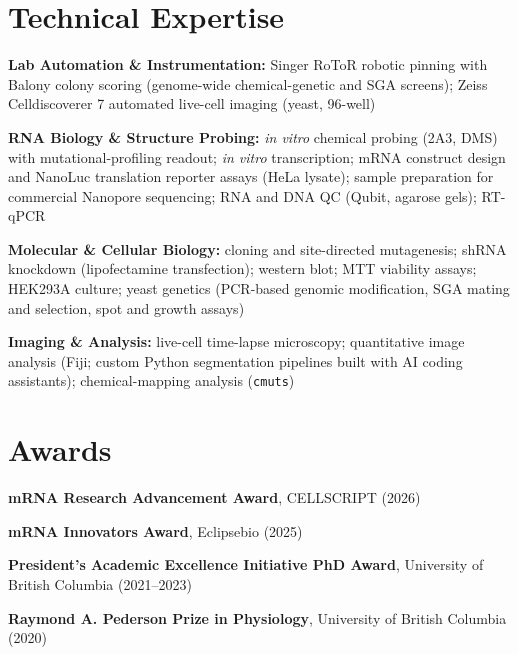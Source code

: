 \documentclass[letterpaper,11pt]{article}
\begin{document}
\section{Technical Expertise}
\begin{itemize}[leftmargin=0.15in, label={}]
  \small{
    \item \textbf{Lab Automation \& Instrumentation:}{ Singer RoToR robotic pinning with Balony colony scoring (genome-wide chemical-genetic and SGA screens); Zeiss Celldiscoverer 7 automated live-cell imaging (yeast, 96-well)}
    \item \textbf{RNA Biology \& Structure Probing:}{ \textit{in vitro} chemical probing (2A3, DMS) with mutational-profiling readout; \textit{in vitro} transcription; mRNA construct design and NanoLuc translation reporter assays (HeLa lysate); sample preparation for commercial Nanopore sequencing; RNA and DNA QC (Qubit, agarose gels); RT-qPCR}
    \item \textbf{Molecular \& Cellular Biology:}{ cloning and site-directed mutagenesis; shRNA knockdown (lipofectamine transfection); western blot; MTT viability assays; HEK293A culture; yeast genetics (PCR-based genomic modification, SGA mating and selection, spot and growth assays)}
    \item \textbf{Imaging \& Analysis:}{ live-cell time-lapse microscopy; quantitative image analysis (Fiji; custom Python segmentation pipelines built with AI coding assistants); chemical-mapping analysis (\texttt{cmuts})}
  }
\end{itemize}

\section{Awards}
  \begin{itemize}[leftmargin=0.15in, label={}]
    \small{
     \item \textbf{mRNA Research Advancement Award}, CELLSCRIPT (2026)
     \item \textbf{mRNA Innovators Award}, Eclipsebio (2025)
     \item \textbf{President's Academic Excellence Initiative PhD Award}, University of British Columbia (2021--2023)
     \item \textbf{Raymond A. Pederson Prize in Physiology}, University of British Columbia (2020)
   }
   \end{itemize}

\end{document}
